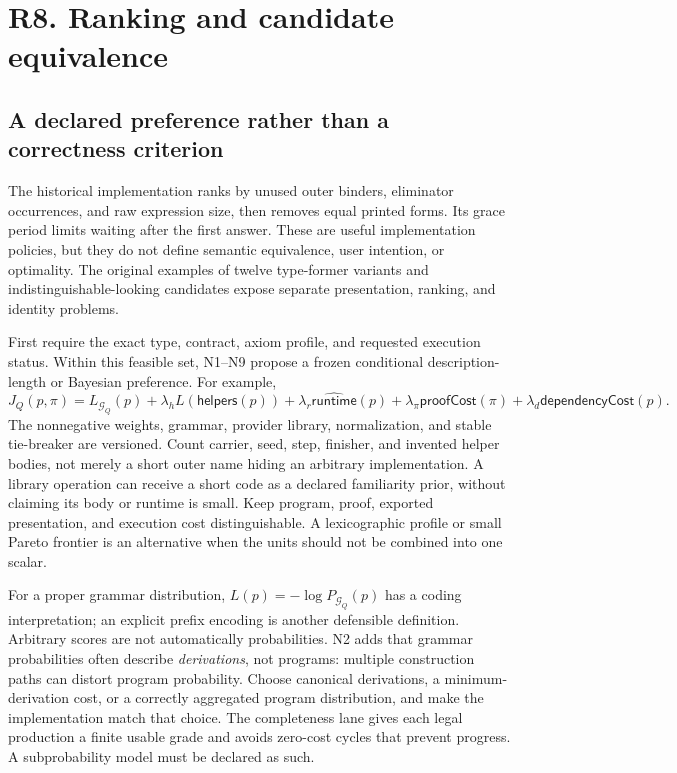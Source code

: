 \section{R8. Ranking and candidate equivalence}\label{sec:ranking}

\subsection{A declared preference rather than a correctness criterion}\label{sec:ranking-objective}

The historical implementation ranks by unused outer binders, eliminator occurrences, and raw expression size, then removes equal printed forms. Its grace period limits waiting after the first answer. These are useful implementation policies, but they do not define semantic equivalence, user intention, or optimality. The original examples of twelve type-former variants and indistinguishable-looking candidates expose separate presentation, ranking, and identity problems.

First require the exact type, contract, axiom profile, and requested execution status. Within this feasible set, N1--N9 propose a frozen conditional description-length or Bayesian preference. For example,
\begin{equation}
 J_Q(p,\pi)=L_{\mathcal G_Q}(p)
       +\lambda_h L(\mathsf{helpers}(p))
       +\lambda_r\widehat{\mathsf{runtime}}(p)
       +\lambda_\pi\mathsf{proofCost}(\pi)
       +\lambda_d\mathsf{dependencyCost}(p).
 \label{eq:ranking-objective}
\end{equation}
The nonnegative weights, grammar, provider library, normalization, and stable tie-breaker are versioned. Count carrier, seed, step, finisher, and invented helper bodies, not merely a short outer name hiding an arbitrary implementation. A library operation can receive a short code as a declared familiarity prior, without claiming its body or runtime is small. Keep program, proof, exported presentation, and execution cost distinguishable. A lexicographic profile or small Pareto frontier is an alternative when the units should not be combined into one scalar.

For a proper grammar distribution, $L(p)=-\log P_{\mathcal G_Q}(p)$ has a coding interpretation; an explicit prefix encoding is another defensible definition. Arbitrary scores are not automatically probabilities. N2 adds that grammar probabilities often describe \emph{derivations}, not programs: multiple construction paths can distort program probability. Choose canonical derivations, a minimum-derivation cost, or a correctly aggregated program distribution, and make the implementation match that choice. The completeness lane gives each legal production a finite usable grade and avoids zero-cost cycles that prevent progress. A subprobability model must be declared as such.

